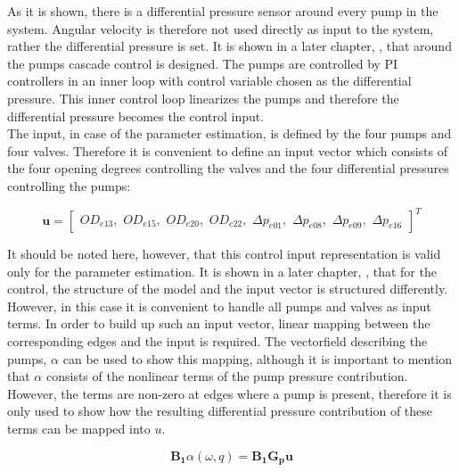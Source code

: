 As it is shown, there is a differential pressure sensor around every pump in the system. Angular velocity is therefore not used directly as input to the system, rather the differential pressure is set. It is shown in a later chapter, , that around the pumps cascade control is designed. The pumps are controlled by PI controllers in an inner loop with control variable chosen as the differential pressure. This inner control loop linearizes the pumps and therefore the differential pressure becomes the control input. 
\\
The input, in case of the parameter estimation, is defined by the four pumps and four valves. Therefore it is convenient to define an input vector which consists of the four opening degrees controlling the valves and the four differential pressures controlling the pumps: 

\begin{equation}
\bm{u} =
\begin{bmatrix} 
OD_{e13},\hspace{4pt} 
OD_{e15},\hspace{4pt} 
OD_{e20},\hspace{4pt} 
OD_{e22},\hspace{4pt} 
\Delta p_{e01},\hspace{4pt} 
\Delta p_{e08},\hspace{4pt} 
\Delta p_{e09},\hspace{4pt} 
\Delta p_{e16} 
\label{inputvector}
\end{bmatrix} ^T
\end{equation}

It should be noted here, however, that this control input representation is valid only for the parameter estimation. It is shown in a later chapter, , that for the control, the structure of the model and the input vector is structured differently. However, in this case it is convenient to handle all pumps and valves as input terms. In order to build up such an input vector, linear mapping between the corresponding edges and the input is required. The vectorfield describing the pumps, $\alpha$ can be used to show this mapping, although it is important to mention that $\alpha$ consists of the nonlinear terms of the pump pressure contribution. However, the terms are non-zero at edges where a pump is present, therefore it is only used to show how the resulting differential pressure contribution of these terms can be mapped into $u$.

\begin{equation}
\bm{B_1} \alpha(\omega, q) = \bm{B_1} \bm{G_p} \bm{u}
\label{gamma_lin}
\end{equation}

